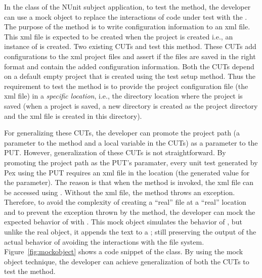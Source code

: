 In the  class of the NUnit subject application, to test the  method, the developer can use a mock object to replace the interactions of code under test with the . The purpose of the  method is to write configuration information to an xml file. This xml file is expected to be created when the project is created i.e., an instance of  is created. Two existing CUTs  and  test this  method. These CUTs add configurations to the xml project files and assert if the files are saved in the right format and contain the added configuration information. Both the CUTs depend on a default empty project that is created using the test setup method. Thus the requirement to test the  method is to provide the project configuration file (the xml file) in a \emph{specific location}, i.e., the directory location where the project is saved (when a project is saved, a new directory is created as the project directory and the xml file is created in this directory). 

For generalizing these CUTs, the developer can promote the project path (a parameter to the  method and a local variable in the CUTs) as a parameter to the PUT. However, generalization of these CUTs is not straightforward. By promoting the project path as the PUT's paramater, every unit test generated by Pex using the PUT requires an xml file in the location (the generated value for the parameter). The reason is that when the  method is invoked, the xml file can be accessed using . Without the xml file, the  method throws an exception. Therefore, to avoid the complexity of creating a ``real'' file at a ``real'' location and to prevent the exception thrown by the  method, the developer can mock the expected behavior of  with . This mock object simulates the behavior of , but unlike the real object, it appends the text to a ; still preserving the output of the actual behavior of  avoiding the interactions with the file system. Figure~\ref{fig:mockobject} shows a code snippet of the  class. By using the mock object technique, the developer can achieve generalization of both the CUTs to test the  method.


